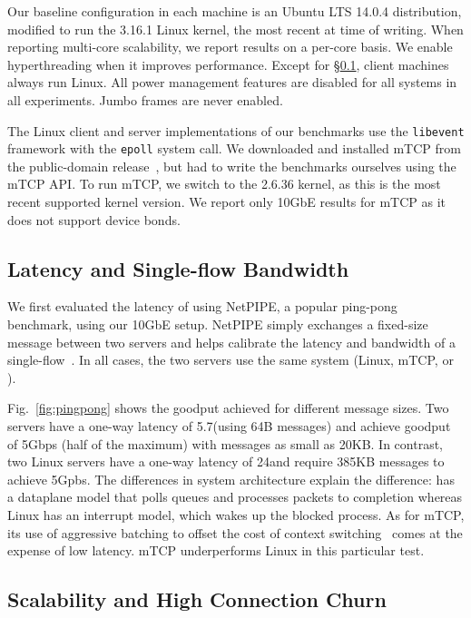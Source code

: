 Our baseline configuration in each
machine is an Ubuntu LTS 14.0.4 distribution, modified to run the 3.16.1 Linux kernel, the most
recent at time of writing.
When reporting multi-core scalability, we report
results on a per-core basis. We enable hyperthreading when it improves performance. Except for
\S\ref{sec:eval:netpipe}, client machines always run Linux. All power
management features are disabled for all systems in all
experiments. Jumbo frames are never enabled.


The Linux client and server implementations of our benchmarks use the
\texttt{libevent} framework with the \texttt{epoll} system call.  We
downloaded and installed mTCP from the public-domain
release~\cite{url:mtcp}, but had to write the benchmarks ourselves
using the mTCP API.  To run mTCP, we switch to the 2.6.36 kernel, as
this is the most recent supported kernel version.  We report only
10GbE results for mTCP as it does not support device bonds.


\subsection{Latency and Single-flow Bandwidth}
\label{sec:eval:netpipe}

We first evaluated the latency of \ix using NetPIPE, a popular
ping-pong benchmark, using our 10GbE setup.  NetPIPE simply exchanges
a fixed-size message between two servers and helps calibrate the
latency and bandwidth of a single-flow~\cite{snell1996netpipe}.  In
all cases, the two servers use the same system (Linux, mTCP, or \ix).


Fig.~\ref{fig:pingpong} shows the goodput achieved for different
message sizes.  Two \ix servers have a one-way latency of
5.7\microsecond (using 64B messages) and achieve goodput of 5Gbps
(half of the maximum) with messages as small as 20KB. In contrast, two
Linux servers have a one-way latency of 24\microsecond and require
385KB messages to achieve 5Gpbs.  The differences in system
architecture explain the difference: \ix has a dataplane model that
polls queues and processes packets to completion whereas Linux has an
interrupt model, which wakes up the blocked process.  
As for mTCP, its use of aggressive batching to offset the cost of
context switching~\cite{jeong2014mtcp} comes at the expense of low
latency. mTCP underperforms Linux in this particular test.




\subsection{Scalability and High Connection Churn}
\label{sec:eval:short}



